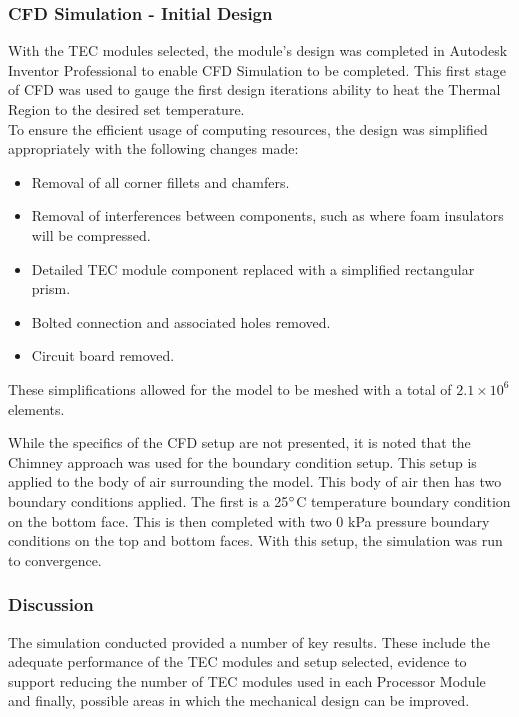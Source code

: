 \subsubsection{CFD Simulation - Initial Design}
\label{initialcfd}

With the TEC modules selected, the module's design was completed in Autodesk Inventor Professional to enable CFD Simulation to be completed. This first stage of CFD was used to gauge the first design iterations ability to heat the Thermal Region to the desired set temperature.\\

To ensure the efficient usage of computing resources, the design was simplified appropriately with the following changes made:
\begin{itemize}
	\item Removal of all corner fillets and chamfers.
	\item Removal of interferences between components, such as where foam insulators will be compressed.
	\item Detailed TEC module component replaced with a simplified rectangular prism.
	\item Bolted connection and associated holes removed.
	\item Circuit board removed.
\end{itemize}

These simplifications allowed for the model to be meshed with a total of $2.1\times 10^6$ elements.

While the specifics of the CFD setup are not presented, it is noted that the Chimney approach was used for the boundary condition setup. This setup is applied to the body of air surrounding the model. This body of air then has two boundary conditions applied. The first is a 25$\degree$C temperature boundary condition on the bottom face. This is then completed with two 0 kPa pressure boundary conditions on the top and bottom faces. With this setup, the simulation was run to convergence.\\

\subsubsection{Discussion}

The simulation conducted provided a number of key results. These include the adequate performance of the TEC modules and setup selected, evidence to support reducing the number of TEC modules used in each Processor Module and finally, possible areas in which the mechanical design can be improved.\\


